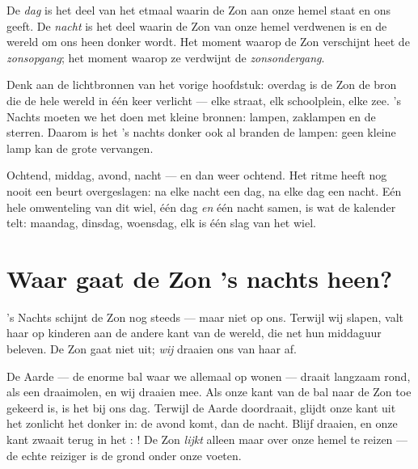 \begin{definition}\label{def:g1:day-and-night:daynight}
De \emph{dag} is het deel van het etmaal waarin de Zon aan
onze hemel staat en ons  geeft. De \emph{nacht} is
het deel waarin de Zon van onze hemel verdwenen is en de wereld om ons
heen donker wordt. Het moment waarop de Zon verschijnt heet de
\emph{zonsopgang}; het moment waarop ze verdwijnt de
\emph{zonsondergang}.
\end{definition}

\begin{remark}\label{rem:g1:day-and-night:lamp}
Denk aan de lichtbronnen van het vorige hoofdstuk: overdag is de Zon
de bron die de hele wereld in één keer verlicht --- elke straat, elk
schoolplein, elke zee. 's Nachts moeten we het doen met kleine
bronnen: lampen, zaklampen en de sterren. Daarom is het 's nachts
donker ook al branden de lampen: geen kleine lamp kan de grote
vervangen.
\end{remark}

\begin{example}\label{ex:g1:day-and-night:rhythm}
Ochtend, middag, avond, nacht --- en dan weer ochtend. Het ritme heeft
nog nooit een beurt overgeslagen: na elke nacht een dag, na elke dag
een nacht. Eén hele omwenteling van dit wiel, één dag \emph{en} één
nacht samen, is wat de kalender telt: maandag, dinsdag, woensdag, elk
is één slag van het wiel.
\end{example}

\section{Waar gaat de Zon 's nachts heen?}

's Nachts schijnt de Zon nog steeds --- maar niet op ons. Terwijl wij
slapen, valt haar  op kinderen aan de andere kant van de wereld,
die net hun middaguur beleven. De Zon gaat niet uit; \emph{wij}
draaien ons van haar af.

\begin{example}\label{ex:g1:day-and-night:spinning}
De Aarde --- de enorme bal waar we allemaal op wonen --- draait
langzaam rond, als een draaimolen, en wij draaien mee. Als onze kant
van de bal naar de Zon toe gekeerd is, is het bij ons dag. Terwijl de
Aarde doordraait, glijdt onze kant uit het zonlicht het donker in: de
avond komt, dan de nacht. Blijf draaien, en onze kant zwaait terug in
het : ! De Zon \emph{lijkt} alleen maar over onze
hemel te reizen --- de echte reiziger is de grond onder onze voeten.
\end{example}

